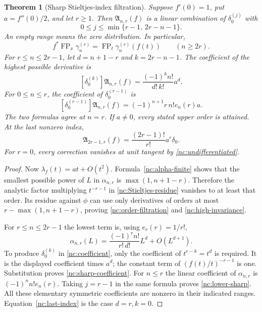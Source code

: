 \documentclass[11pt,a4paper]{article}
\numberwithin{equation}{section}
\newtheorem{theorem}{Theorem}[section]
\theoremstyle{definition}
\theoremstyle{remark}
\DeclareMathOperator{\FP}{FP}
\begin{document}
\begin{theorem}[Sharp Stieltjes-index filtration]
\label{nc:rigidity}
Suppose $f'(0)=1$, put $a=f''(0)/2$, and let $r\geq1$. Then
$\mathfrak A_{n,r}(f)$ is a linear combination of
$\delta_0^{(j)}$ with
\begin{equation}\label{nc:order-filtration}
 0\leq j\leq\min\{r-1,\,2r-n-1\}.
\end{equation}
An empty range means the zero distribution. In particular,
\begin{equation}\label{nc:high-invariance}
 \boxed{\quad
 f^*\FP_x\gamma_n^{(r)}
      =\FP_t\gamma_n^{(r)}(f(t))\qquad(n\geq2r).
 \quad}
\end{equation}
For $r\leq n\leq2r-1$, let
$d=n+1-r$ and $k=2r-n-1$. The coefficient of the highest possible
derivative is
\begin{equation}\label{nc:sharp-coefficient}
 [\delta_0^{(k)}]\mathfrak A_{n,r}(f)
        =\frac{(-1)^kn!}{d!\,k!}a^d.
\end{equation}
For $0\leq n\leq r$, the coefficient of $\delta_0^{(r-1)}$ is
\begin{equation}\label{nc:lower-sharp}
 [\delta_0^{(r-1)}]\mathfrak A_{n,r}(f)
       =(-1)^{n+1}r\,n!e_n(r)a.
\end{equation}
The two formulas agree at $n=r$. If $a\ne0$, every stated upper
order is attained. At the last nonzero index,
\begin{equation}\label{nc:last-index}
 \mathfrak A_{2r-1,r}(f)
     =\frac{(2r-1)!}{r!}a^r\delta_0.
\end{equation}
For $r=0$, every correction vanishes at unit tangent by
\eqref{nc:undifferentiated}.
\end{theorem}

\begin{proof}
Now $\lambda_f(t)=a t+O(t^2)$. Formula~\eqref{nc:alpha-finite}
shows that the smallest possible power of $L$ in $\alpha_{n,r}$ is
$\max(1,n+1-r)$. Therefore the analytic factor multiplying
$t^{-r-1}$ in \eqref{nc:Stieltjes-residue} vanishes to at least that
order. Its residue against $\phi$ can use only derivatives of orders
at most $r-\max(1,n+1-r)$, proving
\eqref{nc:order-filtration} and \eqref{nc:high-invariance}.

For $r\leq n\leq2r-1$ the lowest term is, using $e_r(r)=1/r!$,
\[
 \alpha_{n,r}(L)
    =\frac{(-1)^rn!}{r!\,d!}L^d+O(L^{d+1}).
\]
To produce $\delta_0^{(k)}$ in \eqref{nc:coefficient}, only the
coefficient of $t^{r-k}=t^d$ is required. It is the displayed
coefficient times $a^d$; the constant term of $(f(t)/t)^{-r-1}$ is
one. Substitution proves \eqref{nc:sharp-coefficient}. For $n\leq r$
the linear coefficient of $\alpha_{n,r}$ is
$(-1)^nn!e_n(r)$. Taking $j=r-1$ in the same formula proves
\eqref{nc:lower-sharp}. All these elementary symmetric coefficients
are nonzero in their indicated ranges. Equation~\eqref{nc:last-index}
is the case $d=r,k=0$.
\end{proof}
\end{document}
